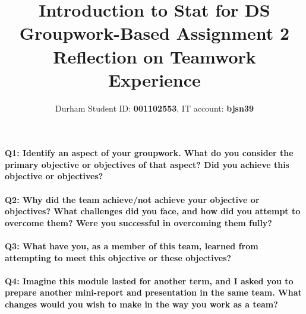 \documentclass[11pt]{article} %
\title{Introduction to Stat for DS Groupwork-Based Assignment 2 \\ Reflection on Teamwork Experience}
\author{Durham Student ID: \textbf{001102553}, IT account: \textbf{bjsn39}}
\begin{document}
\maketitle
% 
% 
% 
\paragraph{\textbf{Q1: Identify an aspect of your groupwork. What do you consider the primary objective or objectives of that aspect? Did you achieve this objective or objectives?}}
\paragraph{\textbf{Q2: Why did the team achieve/not achieve your objective or objectives? What challenges did you face, and how did you attempt to overcome them? Were you successful in overcoming them fully?}}
\paragraph{\textbf{Q3: What have you, as a member of this team, learned from attempting to meet this objective or these objectives?}}
\paragraph{\textbf{Q4: Imagine this module lasted for another term, and I asked you to prepare another mini-report and presentation in the same team. What changes would you wish to make in the way you work as a team?}}
% 
% 
% 
% 
% 
\end{document}
